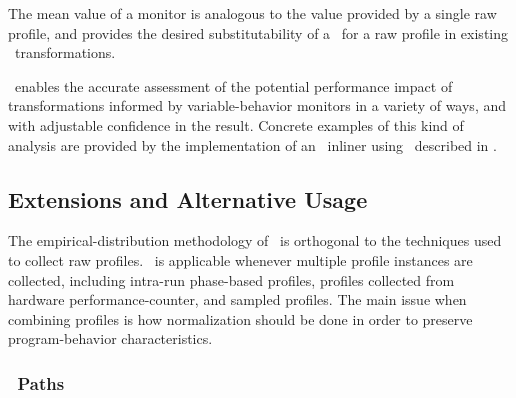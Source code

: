 The mean value of a monitor is analogous to the value provided by a
single raw profile, and provides the desired substitutability of a
\CProf\ for a raw profile in existing \FDO\ transformations.


\CP\ enables the accurate assessment of the
potential performance impact of transformations informed by
variable-behavior monitors in a variety of ways, and with adjustable
confidence in the result. Concrete examples of this kind of analysis
are provided by the implementation of an \FDO\ inliner using
\CP\ described in \cite{BerubePhD}.


\subsection{Extensions and Alternative Usage}
\label{cp:extend}

The empirical-distribution methodology of \CP\ is orthogonal to the
techniques used to collect raw profiles.  \CP\ is applicable whenever
multiple profile instances are collected, including intra-run
phase-based profiles, profiles collected from hardware
performance-counter, and sampled profiles.  The main issue when
combining profiles is how normalization should be done in order to
preserve program-behavior characteristics.

\subsubsection{\CFG\ Paths}

